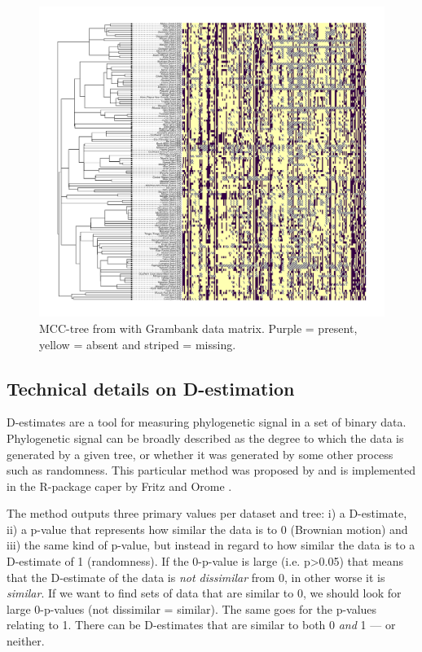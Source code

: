 \documentclass[12pt,letterpaper]{article}
\begin{document}
\begin{figure}[!ht]
\centering
\includegraphics[width=17cm]{illustrations/plots_from_R/coverage_plots/tree_heatmap_gray_mcct.png}
\caption{MCC-tree from \citet{grayetal_2009} with Grambank data matrix. Purple = present, yellow = absent and striped = missing.}
\label{fig:tree_heatmap}
\end{figure}



\subsection{Technical details on D-estimation}
\label{supp:d_estimate}
D-estimates are a tool for measuring phylogenetic signal in a set of binary data. Phylogenetic signal can be broadly described as the degree to which the data is generated by a given tree, or whether it was generated by some other process such as randomness. This particular method was proposed by \cite{fritz2010selectivity} and is implemented in the R-package caper by Fritz and Orome \citep{orme2013caper}. 

The method outputs three primary values per dataset and tree: i) a D-estimate, ii) a p-value that represents how similar the data is to 0 (Brownian motion) and iii) the same kind of p-value, but instead in regard to how similar the data is to a D-estimate of 1 (randomness). If the 0-p-value is large (i.e. p>0.05) that means that the D-estimate of the data is \emph{not dissimilar} from 0, in other worse it is \emph{similar}. If we want to find sets of data that are similar to 0, we should look for large 0-p-values (not dissimilar = similar). The same goes for the p-values relating to 1. There can be D-estimates that are similar to both 0 \emph{and} 1 --- or neither.
\end{document}
